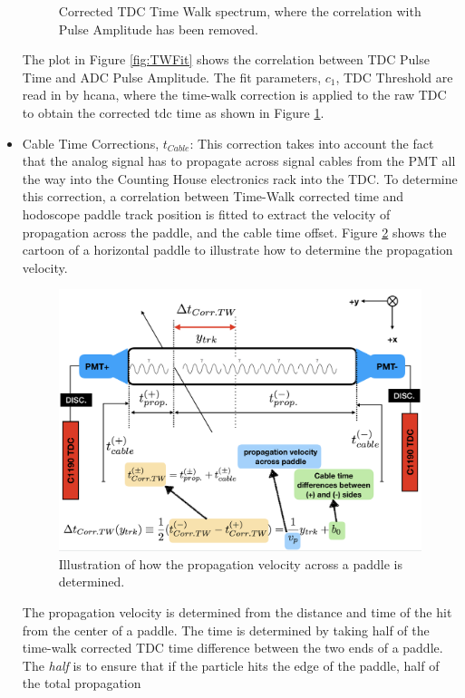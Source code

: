 \documentclass[14pt]{article}
\begin{document}
\begin{itemize}
\begin{figure}[H]
    \caption{Corrected TDC Time Walk spectrum, where the correlation with Pulse Amplitude has been removed.}
    \label{fig:TWCorr}
  \end{figure}
\newpage
The plot in Figure \ref{fig:TWFit} shows the correlation between TDC Pulse Time and ADC Pulse Amplitude.  The fit parameters, $c_{1}$, TDC Threshold are read in by hcana, where
the time-walk correction is applied to the raw TDC to obtain the corrected tdc time as shown in Figure \ref{fig:TWCorr}.
\item Cable Time Corrections, $t_{Cable}$: This correction takes into account the fact that the analog signal has
  to propagate across signal cables from the PMT all the way into the Counting House electronics rack into the TDC.
  To determine this correction, a correlation between Time-Walk corrected time and hodoscope paddle track position is fitted
  to extract the velocity of propagation across the paddle, and the cable time offset. Figure \ref{fig:Vp} shows the cartoon of a
  horizontal paddle to illustrate how to determine the propagation velocity.
\begin{figure}[H]
    \captionsetup{justification=raggedright,singlelinecheck=false}
    \includegraphics[scale=0.5]{Vp.png}
    \caption{Illustration of how the propagation velocity across a paddle is determined.}
    \label{fig:Vp}
\end{figure}
The propagation velocity is determined from the distance and time of the hit from the center of a paddle.
The time is determined by taking half of the time-walk corrected TDC time difference between the two ends of a paddle.
The \textit{half} is to ensure that if the particle hits the edge of the paddle, half of the total propagation

\end{itemize}
\end{document}
